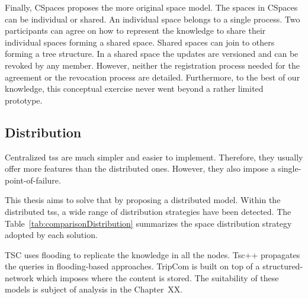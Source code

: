 Finally, CSpaces \citep{martinrecuerda_towards_2005} proposes the more original space model.
The spaces in CSpaces can be individual or shared.
An individual space belongs to a single process.
Two participants can agree on how to represent the knowledge to share their individual spaces forming a shared space.
Shared spaces can join to others forming a tree structure.
In a shared space the updates are versioned and can be revoked by any member.
However, neither the registration process needed for the agreement or the revocation process are detailed.
Furthermore, to the best of our knowledge, this conceptual exercise never went beyond a rather limited prototype.








\subsection{Distribution} %

Centralized \aclp{ts} are much simpler and easier to implement.
Therefore, they usually offer more features than the distributed ones.
However, they also impose a single-point-of-failure.

This thesis aims to solve that by proposing a distributed model.
Within the distributed \aclp{ts}, a wide range of distribution strategies have been detected.
The Table~\ref{tab:comparisonDistribution} summarizes the space distribution strategy adopted by each solution.

TSC uses flooding to replicate the knowledge in all the nodes.
Tsc++ propagates the queries in flooding-based approaches.
TripCom is built on top of a structured-network which imposes where the content is stored.
The suitability of these models is subject of analysis in the Chapter~XX.

